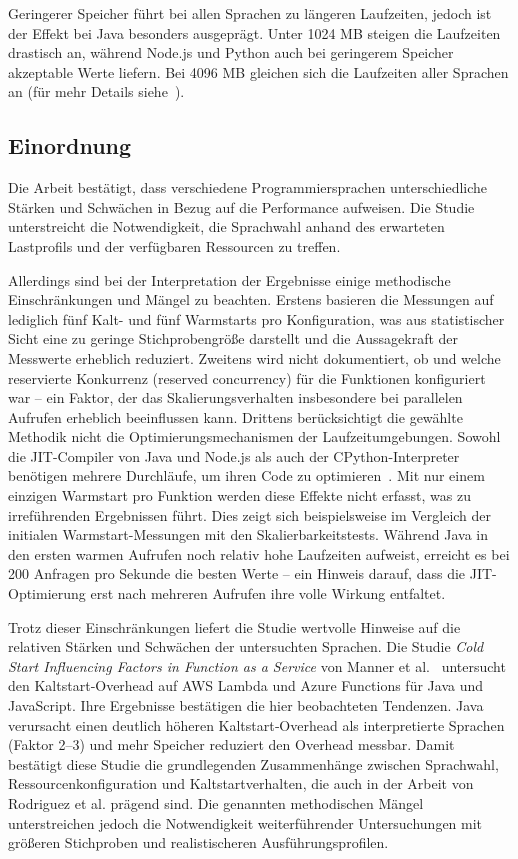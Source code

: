 Geringerer Speicher führt bei allen Sprachen zu längeren Laufzeiten, 
jedoch ist der Effekt bei Java besonders ausgeprägt. Unter 1024 MB steigen die Laufzeiten drastisch an, während Node.js und Python auch 
bei geringerem Speicher akzeptable Werte liefern. Bei 4096 MB gleichen sich die Laufzeiten aller Sprachen an (für mehr Details siehe~\cite{Rodriguez2024Evaluation}).

\subsection{Einordnung}
\label{subsec:rodriguez-discussion}
Die Arbeit bestätigt, dass verschiedene Programmiersprachen unterschiedliche Stärken und Schwächen in Bezug auf 
die Performance aufweisen. Die Studie unterstreicht 
die Notwendigkeit, die Sprachwahl anhand des erwarteten Lastprofils und der verfügbaren Ressourcen zu treffen.

Allerdings sind bei der Interpretation der Ergebnisse einige methodische Einschränkungen und Mängel zu beachten. 
Erstens basieren die Messungen auf lediglich fünf Kalt- und fünf Warmstarts pro Konfiguration, was aus statistischer Sicht eine zu 
geringe Stichprobengröße darstellt und die Aussagekraft der Messwerte erheblich reduziert. 
Zweitens wird nicht dokumentiert, ob und welche reservierte Konkurrenz (reserved concurrency) für die Funktionen konfiguriert war 
– ein Faktor, der das Skalierungsverhalten insbesondere bei parallelen Aufrufen erheblich beeinflussen kann. 
Drittens berücksichtigt die gewählte Methodik nicht die Optimierungsmechanismen der Laufzeitumgebungen. 
Sowohl die \ac{JIT}-Compiler von Java und Node.js als auch der CPython-Interpreter benötigen mehrere Durchläufe, 
um ihren Code zu optimieren~\cite{CPythonPEP659,FromWarmToHotStarts}. Mit nur einem einzigen Warmstart pro Funktion werden diese Effekte nicht erfasst, 
was zu irreführenden Ergebnissen führt. Dies zeigt sich beispielsweise im Vergleich der initialen Warmstart-Messungen mit 
den Skalierbarkeitstests. Während Java in den ersten warmen Aufrufen noch relativ hohe Laufzeiten aufweist, 
erreicht es bei 200 Anfragen pro Sekunde die besten Werte – ein Hinweis darauf, dass die \ac{JIT}-Optimierung erst nach mehreren 
Aufrufen ihre volle Wirkung entfaltet.

Trotz dieser Einschränkungen liefert die Studie wertvolle Hinweise auf die relativen Stärken und Schwächen der untersuchten Sprachen. 
Die Studie \emph{\glqq Cold Start Influencing Factors in Function as a Service\grqq } von Manner et al.~\cite{FaaSColdStart2018} untersucht den 
Kaltstart‑Overhead auf AWS Lambda und Azure Functions für Java und JavaScript. Ihre Ergebnisse bestätigen die hier beobachteten Tendenzen. 
Java verursacht einen deutlich höheren Kaltstart‑Overhead als interpretierte Sprachen (Faktor 2–3) und mehr Speicher reduziert den 
Overhead messbar. Damit bestätigt diese Studie die grundlegenden Zusammenhänge zwischen Sprachwahl, Ressourcenkonfiguration und 
Kaltstartverhalten, die auch in der Arbeit von Rodriguez et al. prägend sind.
Die genannten methodischen Mängel unterstreichen jedoch die Notwendigkeit weiterführender Untersuchungen mit größeren Stichproben 
und realistischeren Ausführungsprofilen.

